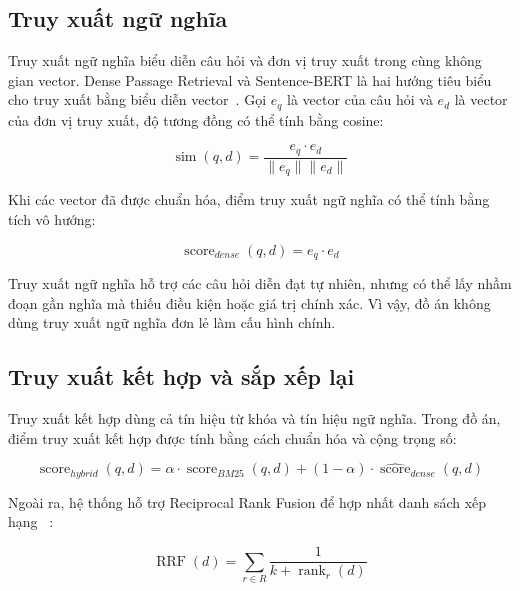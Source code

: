 \documentclass[../DoAn.tex]{subfiles}
\begin{document}
\subsection{Truy xuất ngữ nghĩa}

Truy xuất ngữ nghĩa biểu diễn câu hỏi và đơn vị truy xuất trong cùng không gian vector.
Dense Passage Retrieval và Sentence-BERT là hai hướng tiêu biểu cho truy xuất
bằng biểu diễn vector~\cite{karpukhin2020dpr,reimers2019sentencebert}. Gọi \(e_q\)
là vector của câu hỏi và \(e_d\) là vector của đơn vị truy xuất, độ tương đồng có
thể tính bằng cosine:

\begin{equation}
\label{eq:cosine-similarity}
\operatorname{sim}(q,d)=
\frac{e_q \cdot e_d}{\|e_q\|\|e_d\|}
\end{equation}

Khi các vector đã được chuẩn hóa, điểm truy xuất ngữ nghĩa có thể tính bằng tích vô hướng:

\begin{equation}
\label{eq:dense-dot-product}
\operatorname{score}_{dense}(q,d)=e_q \cdot e_d
\end{equation}

Truy xuất ngữ nghĩa hỗ trợ các câu hỏi diễn đạt tự nhiên, nhưng có thể lấy nhầm
đoạn gần nghĩa mà thiếu điều kiện hoặc giá trị chính xác. Vì vậy, đồ án không dùng
truy xuất ngữ nghĩa đơn lẻ làm cấu hình chính.

\subsection{Truy xuất kết hợp và sắp xếp lại}

Truy xuất kết hợp dùng cả tín hiệu từ khóa và tín hiệu ngữ nghĩa. Trong đồ án,
điểm truy xuất kết hợp được tính bằng cách chuẩn hóa và cộng trọng số:

\begin{equation}
\label{eq:hybrid-score}
\operatorname{score}_{hybrid}(q,d)
=
\alpha \cdot \widehat{\operatorname{score}}_{BM25}(q,d)
+
(1-\alpha) \cdot \widehat{\operatorname{score}}_{dense}(q,d)
\end{equation}

Ngoài ra, hệ thống hỗ trợ Reciprocal Rank Fusion để hợp nhất danh sách xếp hạng~
\cite{cormack2009rrf}:

\begin{equation}
\label{eq:rrf}
\operatorname{RRF}(d)=
\sum_{r \in R}
\frac{1}{k+\operatorname{rank}_r(d)}
\end{equation}
\end{document}
